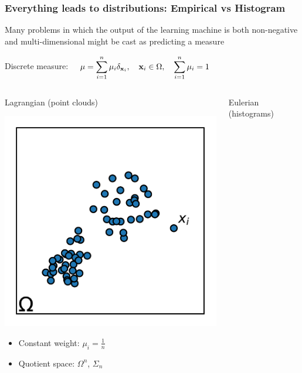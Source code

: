 \documentclass[french,9pt]{beamer}
\newcommand{\x}{{\bf x}}
\begin{document}

\begin{frame}
\frametitle{Everything leads to distributions: Empirical vs Histogram}

Many problems in which the output of the learning machine is both non-negative and multi-dimensional might be cast as predicting a measure

\normalsize\vspace{3mm}
Discrete measure: $\quad\displaystyle \mu=\sum_{i=1}^n \mu_i\delta_{\x_i},\quad
\x_i\in\Omega,\quad \sum_{i=1}^n \mu_i=1$
\begin{columns}[t]
\begin{column}{.45\linewidth}
\begin{block}{Lagrangian (point clouds)}\vspace{-3mm}
\begin{center}
\includegraphics[width=.7\linewidth]{fig/distrib_empirical.pdf}
\end{center}\vspace{-5mm}
\begin{itemize}
\item Constant weight: $\mu_i=\frac{1}{n}$
\item Quotient space: $\Omega^n$, $\Sigma_n$ 
\end{itemize}
\end{block}
\end{column}
\begin{column}{.45\linewidth}
\begin{block}{Eulerian (histograms)}\vspace{-3mm}

\end{block}
\end{column}
\end{columns}
\end{frame}
\end{document}
